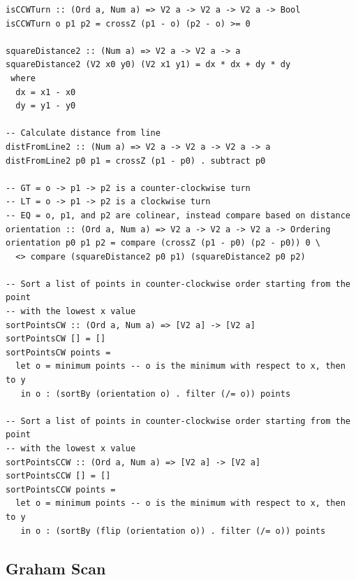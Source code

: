 \documentclass[12pt]{article}
\begin{document}
    \begin{verbatim}
isCCWTurn :: (Ord a, Num a) => V2 a -> V2 a -> V2 a -> Bool
isCCWTurn o p1 p2 = crossZ (p1 - o) (p2 - o) >= 0

squareDistance2 :: (Num a) => V2 a -> V2 a -> a
squareDistance2 (V2 x0 y0) (V2 x1 y1) = dx * dx + dy * dy
 where
  dx = x1 - x0
  dy = y1 - y0

-- Calculate distance from line
distFromLine2 :: (Num a) => V2 a -> V2 a -> V2 a -> a
distFromLine2 p0 p1 = crossZ (p1 - p0) . subtract p0

-- GT = o -> p1 -> p2 is a counter-clockwise turn
-- LT = o -> p1 -> p2 is a clockwise turn
-- EQ = o, p1, and p2 are colinear, instead compare based on distance
orientation :: (Ord a, Num a) => V2 a -> V2 a -> V2 a -> Ordering
orientation p0 p1 p2 = compare (crossZ (p1 - p0) (p2 - p0)) 0 \
  <> compare (squareDistance2 p0 p1) (squareDistance2 p0 p2)

-- Sort a list of points in counter-clockwise order starting from the point
-- with the lowest x value
sortPointsCW :: (Ord a, Num a) => [V2 a] -> [V2 a]
sortPointsCW [] = []
sortPointsCW points =
  let o = minimum points -- o is the minimum with respect to x, then to y
   in o : (sortBy (orientation o) . filter (/= o)) points

-- Sort a list of points in counter-clockwise order starting from the point
-- with the lowest x value
sortPointsCCW :: (Ord a, Num a) => [V2 a] -> [V2 a]
sortPointsCCW [] = []
sortPointsCCW points =
  let o = minimum points -- o is the minimum with respect to x, then to y
   in o : (sortBy (flip (orientation o)) . filter (/= o)) points
  \end{verbatim}

  \subsection*{Graham Scan}
\end{document}
